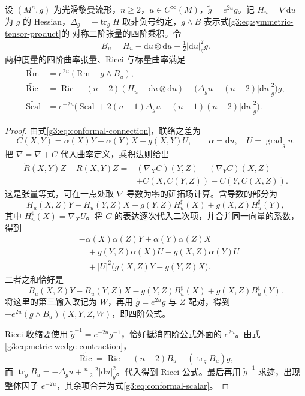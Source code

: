 \begin{theorem}\label{g3:thm:conformal-curvature}
	设 \((M^n,g)\) 为光滑黎曼流形，\(n\ge2\)，\(u\in C^\infty(M)\)，\(\widetilde g=e^{2u}g\)。记 \(H_u=\nabla\mathrm du\) 为 \(g\) 的 Hessian，\(\Delta_g=-\operatorname{tr}_g H\) 取非负号约定，\(g\wedge B\) 表示式\eqref{g3:eq:symmetric-tensor-product}的 对称二阶张量的四阶乘积。令
	\[
		B_u=H_u-\mathrm du\otimes\mathrm du+\tfrac12|\mathrm du|_g^2g.
	\]
	两种度量的四阶曲率张量、Ricci 与标量曲率满足
	\begin{align}
		\widetilde{\mathrm{Rm}}&=e^{2u}(\mathrm{Rm}-g\wedge B_u),\label{g3:eq:conformal-full-curvature}\\
		\widetilde{\operatorname{Ric}}
		&=\operatorname{Ric}-(n-2)(H_u-\mathrm du\otimes\mathrm du)
		+\bigl(\Delta_gu-(n-2)|\mathrm du|_g^2\bigr)g,\label{g3:eq:conformal-ricci}\\
		\widetilde{\operatorname{Scal}}
		&=e^{-2u}\bigl(\operatorname{Scal}+2(n-1)\Delta_gu
		-(n-1)(n-2)|\mathrm du|_g^2\bigr).\label{g3:eq:conformal-scalar}
	\end{align}
\end{theorem}
\begin{proof}
	由式\eqref{g3:eq:conformal-connection}，联络之差为
	\[
		C(X,Y)=\alpha(X)Y+\alpha(Y)X-g(X,Y)U,
		\qquad \alpha=\mathrm du,\quad U=\operatorname{grad}_gu.
	\]
	把 \(\widetilde\nabla=\nabla+C\) 代入曲率定义，乘积法则给出
	\[
		\begin{aligned}
		\widetilde R(X,Y)Z-R(X,Y)Z
		={}&(\nabla_XC)(Y,Z)-(\nabla_YC)(X,Z)\\
		&+C(X,C(Y,Z))-C(Y,C(X,Z)).
		\end{aligned}
	\]
	这是张量等式，可在一点处取 \(\nabla\) 导数为零的延拓场计算。含导数的部分为
	\[
		H_u(X,Z)Y-H_u(Y,Z)X
		-g(Y,Z)H_u^\sharp(X)+g(X,Z)H_u^\sharp(Y),
	\]
	其中 \(H_u^\sharp(X)=\nabla_XU\)。将 \(C\) 的表达逐次代入二次项，并合并同一向量的系数，得到
	\[
		\begin{aligned}
		&-\alpha(X)\alpha(Z)Y+\alpha(Y)\alpha(Z)X\\
		&\quad+g(Y,Z)\alpha(X)U-g(X,Z)\alpha(Y)U\\
		&\quad+|U|^2\bigl(g(X,Z)Y-g(Y,Z)X\bigr).
		\end{aligned}
	\]
	二者之和恰好是
	\[
		B_u(X,Z)Y-B_u(Y,Z)X
		-g(Y,Z)B_u^\sharp(X)+g(X,Z)B_u^\sharp(Y).
	\]
	将这里的第三输入改记为 \(W\)，再用 \(\widetilde g=e^{2u}g\) 与 \(Z\) 配对，得到 \(-e^{2u}(g\wedge B_u)(X,Y,Z,W)\)，即四阶公式。

	Ricci 收缩要使用 \(\widetilde g^{-1}=e^{-2u}g^{-1}\)，恰好抵消四阶公式外面的 \(e^{2u}\)。由式\eqref{g3:eq:metric-wedge-contraction}，
	\[
		\widetilde{\operatorname{Ric}}
		=\operatorname{Ric}-(n-2)B_u-(\operatorname{tr}_gB_u)g,
	\]
	而 \(\operatorname{tr}_gB_u=-\Delta_gu+\tfrac{n-2}{2}|\mathrm du|_g^2\)。代入得到 Ricci 公式。最后再用 \(\widetilde g^{-1}\) 求迹，出现整体因子 \(e^{-2u}\)，其余项合并为式\eqref{g3:eq:conformal-scalar}。
\end{proof}

